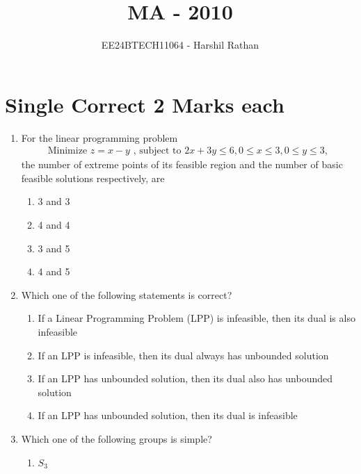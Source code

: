 \documentclass[journal]{IEEEtran}
\begin{document}

\vspace{3cm}

\title{MA - 2010}
\author{EE24BTECH11064 - Harshil Rathan}
\maketitle

\renewcommand{\thefigure}{\theenumi}
\renewcommand{\thetable}{\theenumi}

\section*{Single Correct 2 Marks each}
\begin{enumerate}
\item For the linear programming problem
\begin{align*}
    \text{Minimize } z = x - y \text{ , subject to } 2x + 3y \leq 6, 0 \leq x \leq 3, 0 \leq y \leq 3,
\end{align*}
the number of extreme points of its feasible region and the number of basic feasible solutions respectively, are
\begin{multicols}{2}
    \begin{enumerate}
        \item 3 and 3
        \item 4 and 4 
        \item 3 and 5
        \item 4 and 5
    \end{enumerate}
\end{multicols}
\item Which one of the following statements is correct?
\begin{enumerate}
        \item If a Linear Programming Problem (LPP) is infeasible, then its dual is also infeasible
        \item If an LPP is infeasible, then its dual always has unbounded solution
        \item If an LPP has unbounded solution, then its dual also has unbounded solution
        \item If an LPP has unbounded solution, then its dual is infeasible
\end{enumerate}
\item Which one of the following groups is simple?
\begin{multicols}{2}
\begin{enumerate}
        \item $S_3$

\end{enumerate}
\end{multicols}
\end{enumerate}
\end{document}
